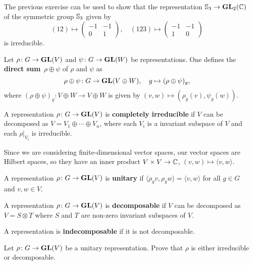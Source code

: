The previous exercise can be used to show that the representation
$\mathbb{S}_3\to\mathbf{GL}_2(\mathbb{C})$
of the symmetric group $\mathbb{S}_3$
given by
\[
(12)\mapsto\begin{pmatrix}
-1&-1\\0&1
\end{pmatrix},
\quad
(123)\mapsto\begin{pmatrix}
-1&-1\\
1&0
\end{pmatrix}
\]
is irreducible.

\begin{example}
Let $\rho\colon G\to\mathbf{GL}(V)$ and $\psi\colon G\to\mathbf{GL}(W)$ be representations. One defines
the \textbf{direct sum} $\rho\oplus\psi$ of $\rho$ and $\psi$ as 
\[
\rho\oplus\psi\colon G\to\mathbf{GL}(V\oplus W),\quad
g\mapsto (\rho\oplus\psi)_g,
\]
where $(\rho\oplus\psi)_g\colon V\oplus W\to V\oplus W$ is given by 
$(v,w)\mapsto (\rho_g(v),\psi_g(w))$.
\end{example}

\begin{definition}
    A representation $\rho\colon G\to\mathbf{GL}(V)$ is \textbf{completely irreducible}
    if $V$ can be decomposed as
    $V=V_1\oplus\cdots\oplus V_n$, where each $V_i$ is a invariant subspace of $V$ and
    each $\rho|_{V_i}$ is irreducible.
\end{definition}

Since we are considering finite-dimensional vector spaces, our vector spaces are
Hilbert spaces, so they have
an inner product $V\times V\to\mathbb{C}$, $(v,w)\mapsto\langle v,w\rangle$.

\begin{definition}
    A representation $\rho\colon G\to\mathbf{GL}(V)$ is \textbf{unitary} if
    $\langle \rho_gv,\rho_gw\rangle=\langle v,w\rangle$ for all $g\in G$ and $v,w\in V$.
\end{definition}

\begin{definition}
A representation
$\rho\colon G\to\mathbf{GL}(V)$ is \textbf{decomposable} if $V$ can be decomposed as $V=S\otimes T$
where $S$ and $T$ are non-zero invariant subspaces of $V$. 
\end{definition}

A representation is 
\textbf{indecomposable} if it is not decomposable. 

\begin{exercise}
Let $\rho\colon G\to\mathbf{GL}(V)$ be a unitary representation. Prove that $\rho$ is either
irreducible or decomposable.
\end{exercise}


